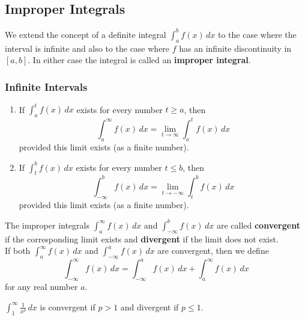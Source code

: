 \subsection{Improper Integrals}
We extend the concept of a definite integral
\(\displaystyle{\int_a^b f(x)\,dx}\) to the case where the interval is
infinite and also to the case where \(f\) has an infinite discontinuity in
\([a,b]\).
In either case the integral is called an \textbf{improper integral}.

\subsubsection*{Infinite Intervals}
\begin{definition}
    \begin{enumerate}
        \item If \(\displaystyle{\int_a^t f(x)\,dx}\) exists for every number
        \(t\geq a\), then
        \[\int_a^\infty f(x)\,dx=\lim_{t\to\infty}\int_a^t f(x)\,dx\]
        provided this limit exists (as a finite number).
        \item If \(\displaystyle{\int_t^b f(x)\,dx}\) exists for every number
        \(t\leq b\), then
        \[\int_{-\infty}^b f(x)\,dx=\lim_{t\to -\infty}\int_t^b f(x)\,dx\]
        provided this limit exists (as a finite number).
    \end{enumerate}
    The improper integrals \(\displaystyle{\int_a^\infty f(x)\,dx}\) and
    \(\displaystyle{\int_{-\infty}^b f(x)\,dx}\) are called
    \textbf{convergent} if the corresponding limit exists and
    \textbf{divergent} if the limit does not exist. \\
    If both \(\displaystyle{\int_a^\infty f(x)\,dx}\) and
    \(\displaystyle{\int_{-\infty}^a f(x)\,dx}\) are convergent, then we define
    \[\int_{-\infty}^{\infty}f(x)\,dx
    =\int_{-\infty}^a f(x)\,dx+\int_a^\infty f(x)\,dx\]
    for any real number \(a\).
\end{definition}
\(\displaystyle{\int_1^\infty \frac{1}{x^p}\,dx}\) is convergent if \(p>1\)
and divergent if \(p\leq 1\).

